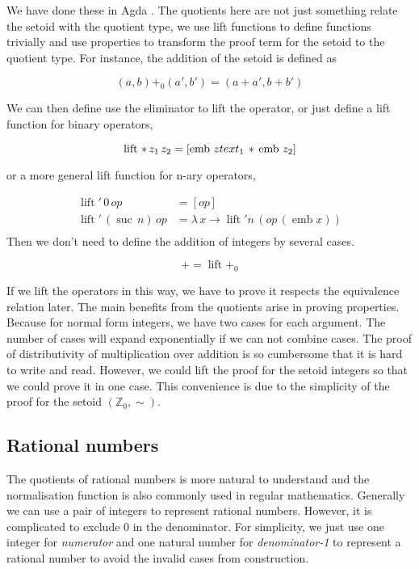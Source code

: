 \documentclass[envcountsame]{llncs}
\newcommand{\Z}{\mathbb{Z}}
\providecommand{\class}[1]{[#1]}
\DeclareMathOperator{\emb}{emb}
\DeclareMathOperator{\lift}{lift}
\DeclareMathOperator{\suc}{suc\,}
\begin{document}
We have done these in Agda \cite{nuo:10}. The quotients here are not just something relate the setoid with the quotient type, we use lift functions to define functions trivially and use properties to transform the proof term for the setoid to the quotient type. For instance, the addition of the setoid is defined as

$$(a,b){+_0}(a', b')= (a+a',b+b')$$

We can then define use the eliminator to lift the operator, or just define a lift function for binary operators,

$$ \lift \,* \,z_1 \,z_2 = \class{\emb \,z\textcolor[rgb]{0,0,0}{text}_1 \,*\,\emb \,z_2}$$

or a more general lift function for n-ary operators,



\begin{align*}
\lift' \,0 \,op &= \class{op}\\
\lift' \,(\suc n) \,op &= \lambda \,x \to \lift' n \,(op \,(\emb x))\\
\end{align*}
Then we don't need to define the addition of integers by several cases.

$$+ = \lift +_0$$

If we lift the operators in this way, we have to prove it respects the equivalence relation later. The main benefits from the quotients arise in proving properties. Because for normal form integers, we have two cases for each argument. The number of cases will expand exponentially if we can not combine cases. The proof of distributivity of multiplication over addition is so cumbersome
that it is hard to write and read. However, we could lift the proof for the setoid integers so that we could prove it in one case. This convenience is due to the simplicity of the proof for the setoid $(\Z_0,\sim)$. 

\subsection{Rational numbers}

The quotients of rational numbers is more natural to understand and the normalisation function is also commonly used in regular mathematics. Generally we can use a pair of integers to represent rational numbers. However, it is complicated to exclude 0 in the denominator. For simplicity, we just use one integer for \emph{numerator} and one natural number for \emph{denominator-1} to represent a rational number to avoid the invalid cases from construction. 
\end{document}
